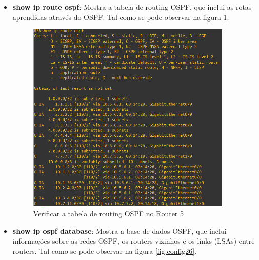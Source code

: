 \documentclass[11pt,english, openright, oneside]{book}
\begin{document}
\begin{itemize}
  \item \textbf{show ip route ospf}: Mostra a tabela de routing OSPF, que inclui as rotas aprendidas através do OSPF. Tal como se pode observar na figura \ref{fig:config25}.
  \vspace{0.2cm}

  \begin{figure}[H]
    \centering
    \includegraphics[width=0.92\textwidth]{imagens/Tarefa3/15.ospf_route_R5.png}
    \caption{Verificar a tabela de routing OSPF no Router 5}
    \label{fig:config25}
  \end{figure}
  \vspace{0.2cm}

  \item \textbf{show ip ospf database}: Mostra a base de dados OSPF, que inclui informações sobre as redes OSPF, os routers vizinhos e os links (LSAs) entre routers. Tal como se pode observar na figura \ref{fig:config26}.
  \vspace{0.2cm}


\end{itemize}
\end{document}
